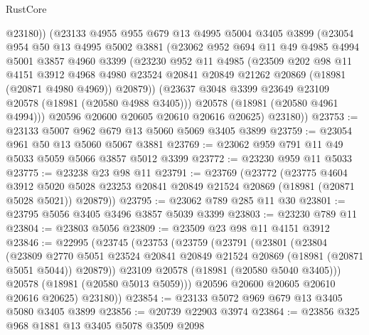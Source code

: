 \begin{lexlean}{RustCore}
\begin{coremodule}
          @23180))
      (@23133
        @4955
        @955
        @679
        @13
        @4995
        @5004
        @3405
        @3899
        (@23054
          @954
          @50
          @13
          @4995
          @5002
          @3881
          (@23062
            @952
            @694
            @11
            @49
            @4985
            @4994
            @5001
            @3857
            @4960
            @3399
            (@23230
              @952
              @11
              @4985
              (@23509
                @202
                @98
                @11
                @4151
                @3912
                @4968
                @4980
                @23524
                @20841
                @20849
                @21262
                @20869
                (@18981 (@20871 @4980 @4969))
                @20879))
            (@23637 @3048 @3399 @23649 @23109 @20578 (@18981 (@20580 @4988 @3405)))
            @20578
            (@18981 (@20580 @4961 @4994)))
          @20596
          @20600
          @20605
          @20610
          @20616
          @20625)
        @23180))
@23753 := @23133 @5007 @962 @679 @13 @5060 @5069 @3405 @3899
@23759 := @23054 @961 @50 @13 @5060 @5067 @3881
@23769 := @23062 @959 @791 @11 @49 @5033 @5059 @5066 @3857 @5012 @3399
@23772 := @23230 @959 @11 @5033
@23775 := @23238 @23 @98 @11
@23791 := @23769
    (@23772
      (@23775
        @4604
        @3912
        @5020
        @5028
        @23253
        @20841
        @20849
        @21524
        @20869
        (@18981 (@20871 @5028 @5021))
        @20879))
@23795 := @23062 @789 @285 @11 @30
@23801 := @23795 @5056 @3405 @3496 @3857 @5039 @3399
@23803 := @23230 @789 @11
@23804 := @23803 @5056
@23809 := @23509 @23 @98 @11 @4151 @3912
@23846 := @22995
    (@23745
      (@23753
        (@23759
          (@23791
            (@23801
              (@23804
                (@23809
                  @2770
                  @5051
                  @23524
                  @20841
                  @20849
                  @21524
                  @20869
                  (@18981 (@20871 @5051 @5044))
                  @20879))
              @23109
              @20578
              (@18981 (@20580 @5040 @3405)))
            @20578
            (@18981 (@20580 @5013 @5059)))
          @20596
          @20600
          @20605
          @20610
          @20616
          @20625)
        @23180))
@23854 := @23133 @5072 @969 @679 @13 @3405 @5080 @3405 @3899
@23856 := @20739 @22903 @3974
@23864 := @23856 @325 @968 @1881 @13 @3405 @5078 @3509 @2098

\end{coremodule}
\end{lexlean}
